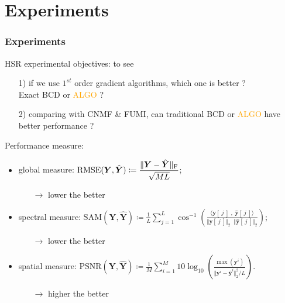\documentclass[10pt,mathserif]{beamer}
\newcommand{\Fr}{_\text F}
\newcommand{\inv}{^{-1}}
\begin{document}
\section{Experiments}
    \begin{frame}
        \frametitle{Experiments}
        HSR experimental objectives: to see
        \begin{itemize}
            \item [1)] if we use $1^{st}$ order gradient algorithms, which one is better ? \\
                       Exact BCD or \textcolor{orange}{ALGO} ?
            \item [2)] comparing with CNMF \& FUMI, can traditional BCD or
                       \textcolor{orange}{ALGO} have better performance ?
        \end{itemize}
        \vspace{0.5cm}
        Performance measure:
        \begin{itemize}
            \item global measure:   {\footnotesize $\displaystyle \text{RMSE}(\bm Y,\hat{\bm Y}) \coloneqq \frac{\Vert \bm Y - \hat{\bm Y} \Vert\Fr}{\sqrt{ML}}$};
                  \begin{itemize}
                      \item [] $\rightarrow$ lower the better
                  \end{itemize}
            \item spectral measure: {\footnotesize $\displaystyle \text{SAM}(\bm Y,\hat{\bm Y}) \coloneqq \frac{1}{L} \sum_{j=1}^L \cos\inv\left( \frac{\langle \bm y[\;j\;] \;,\; \hat{\bm y}[\;j\;] \rangle}{\Vert \bm y[\;j\;] \Vert_2 \;\; \Vert \hat{\bm y}[\;j\;] \Vert_2} \right)$};
                  \begin{itemize}
                      \item [] $\rightarrow$ lower the better
                  \end{itemize}
            \item spatial measure:  {\footnotesize $\displaystyle \text{PSNR}(\bm Y,\hat{\bm Y}) \coloneqq \frac{1}{M} \sum_{i=1}^M 10 \log_{10} \left( \frac{\max(\bm y^i)}{\Vert \bm y^i - \hat{\bm y}^i \Vert_2^2 / L} \right)$}.
                  \begin{itemize}
                      \item [] $\rightarrow$ higher the better
                  \end{itemize}
        \end{itemize}
    \end{frame}
\end{document}

